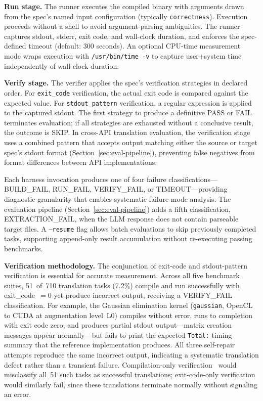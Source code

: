 \documentclass[conference]{IEEEtran}
\begin{document}
\textbf{Run stage.} The runner executes the compiled binary with arguments drawn from the spec's named input configuration (typically \texttt{correctness}). Execution proceeds without a shell to avoid argument-parsing ambiguities. The runner captures stdout, stderr, exit code, and wall-clock duration, and enforces the spec-defined timeout (default: 300 seconds). An optional CPU-time measurement mode wraps execution with \texttt{/usr/bin/time -v} to capture user+system time independently of wall-clock duration.

\textbf{Verify stage.} The verifier applies the spec's verification strategies in declared order. For \texttt{exit\_code} verification, the actual exit code is compared against the expected value. For \texttt{stdout\_pattern} verification, a regular expression is applied to the captured stdout. The first strategy to produce a definitive PASS or FAIL terminates evaluation; if all strategies are exhausted without a conclusive result, the outcome is SKIP. In cross-API translation evaluation, the verification stage uses a combined pattern that accepts output matching either the source or target spec's stdout format (Section~\ref{sec:eval-pipeline}), preventing false negatives from format differences between API implementations.

Each harness invocation produces one of four failure classifications---BUILD\_FAIL, RUN\_FAIL, VERIFY\_FAIL, or TIMEOUT---providing diagnostic granularity that enables systematic failure-mode analysis. The evaluation pipeline (Section~\ref{sec:eval-pipeline}) adds a fifth classification, EXTRACTION\_FAIL, when the LLM response does not contain parseable target files. A \texttt{--resume} flag allows batch evaluations to skip previously completed tasks, supporting append-only result accumulation without re-executing passing benchmarks.

\textbf{Verification methodology.} The conjunction of exit-code and stdout-pattern verification is essential for accurate measurement. Across all five benchmark suites, 51~of~710 translation tasks (7.2\%) compile and run successfully with exit\_code~$= 0$ yet produce incorrect output, receiving a VERIFY\_FAIL classification. For example, the Gaussian elimination kernel (\texttt{gaussian}, OpenCL to CUDA at augmentation level~L0) compiles without error, runs to completion with exit code zero, and produces partial stdout output---matrix creation messages appear normally---but fails to print the expected \texttt{Total:} timing summary that the reference implementation produces. All three self-repair attempts reproduce the same incorrect output, indicating a systematic translation defect rather than a transient failure. Compilation-only verification~\cite{CodeRosetta2024} would misclassify all~51 such tasks as successful translations; exit-code-only verification would similarly fail, since these translations terminate normally without signaling an error.
\end{document}
